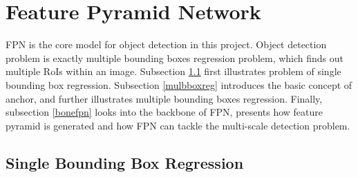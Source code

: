 \section{Feature Pyramid Network}\label{modfpn}

FPN is the core model for object detection in this project. Object detection problem is exactly multiple bounding boxes regression problem, which finds out multiple RoIs within an image. Subsection \ref{sglbboxreg} first illustrates problem of single bounding box regression. Subsection \ref{mulbboxreg} introduces the basic concept of anchor, and further illustrates multiple bounding boxes regression. Finally, subsection \ref{bonefpn} looks into the backbone of FPN, presents how feature pyramid is generated and how FPN can tackle the multi-scale detection problem.

\subsection{Single Bounding Box Regression}\label{sglbboxreg}

